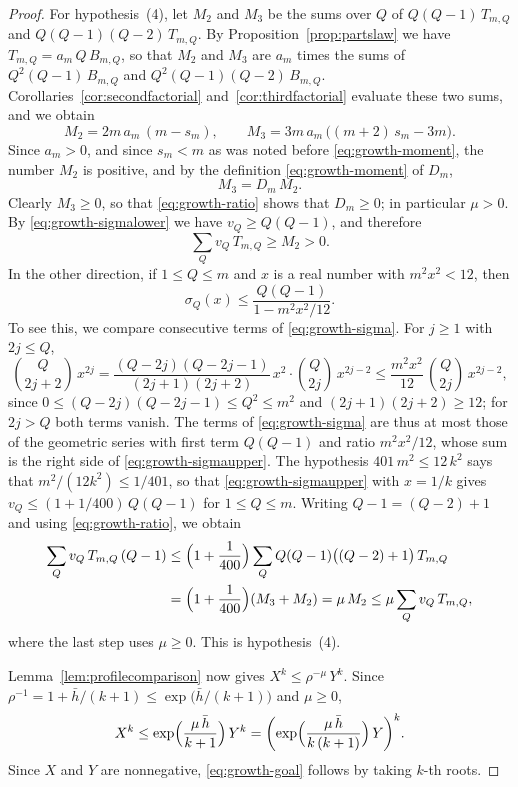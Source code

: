 \documentclass{amsart}
\theoremstyle{definition}
\theoremstyle{remark}
\numberwithin{equation}{section}
\begin{document}
\begin{proof}
For hypothesis~(4), let $M_2$
and $M_3$ be the sums over $Q$ of $Q(Q-1)\,T_{m,Q}$ and
$Q(Q-1)(Q-2)\,T_{m,Q}$. By Proposition~\ref{prop:partslaw} we have
$T_{m,Q}=a_m\,Q\,B_{m,Q}$, so that $M_2$ and $M_3$ are $a_m$ times the sums
of $Q^2(Q-1)\,B_{m,Q}$ and $Q^2(Q-1)(Q-2)\,B_{m,Q}$.
Corollaries~\ref{cor:secondfactorial} and~\ref{cor:thirdfactorial} evaluate
these two sums, and we obtain
\[
M_2=2m\,a_m\,(m-s_m),\qquad M_3=3m\,a_m\,\bigl((m+2)\,s_m-3m\bigr).
\]
Since $a_m>0$, and since $s_m<m$ as was noted before
\eqref{eq:growth-moment}, the number $M_2$ is positive, and by the
definition \eqref{eq:growth-moment} of $D_m$,
\begin{equation}\label{eq:growth-ratio}
M_3=D_m\,M_2.
\end{equation}
Clearly $M_3\ge0$, so that \eqref{eq:growth-ratio} shows that $D_m\ge0$; in
particular $\mu>0$. By
\eqref{eq:growth-sigmalower} we have $v_Q\ge Q(Q-1)$, and therefore
\[
\sum_{Q}v_Q\,T_{m,Q}\ge M_2>0 .
\]
In the other direction, if $1\le Q\le m$ and $x$ is a real number with
$m^2x^2<12$, then
\begin{equation}\label{eq:growth-sigmaupper}
\sigma_Q(x)\le\frac{Q(Q-1)}{1-m^2x^2/12}.
\end{equation}
To see this, we compare consecutive terms of \eqref{eq:growth-sigma}. For
$j\ge1$ with $2j\le Q$,
\[
\binom{Q}{2j+2}\,x^{2j}
=\frac{(Q-2j)(Q-2j-1)}{(2j+1)(2j+2)}\,x^2\cdot\binom{Q}{2j}\,x^{2j-2}
\le\frac{m^2x^2}{12}\,\binom{Q}{2j}\,x^{2j-2},
\]
since $0\le(Q-2j)(Q-2j-1)\le Q^2\le m^2$ and $(2j+1)(2j+2)\ge12$; for $2j>Q$
both terms vanish. The terms of \eqref{eq:growth-sigma} are thus at most
those of the geometric series with first term $Q(Q-1)$ and ratio
$m^2x^2/12$, whose sum is the right side of \eqref{eq:growth-sigmaupper}.
The hypothesis $401\,m^2\le12\,k^2$ says that
$m^2/(12k^2)\le1/401$, so that \eqref{eq:growth-sigmaupper} with $x=1/k$
gives $v_Q\le(1+1/400)\,Q(Q-1)$ for $1\le Q\le m$. Writing $Q-1=(Q-2)+1$
and using \eqref{eq:growth-ratio}, we obtain
\begin{align*}
\sum_{Q}v_Q\,T_{m,Q}\,(Q-1)
&\le\Bigl(1+\frac1{400}\Bigr)\sum_{Q}Q(Q-1)\bigl((Q-2)+1\bigr)\,T_{m,Q}\\
&=\Bigl(1+\frac1{400}\Bigr)(M_3+M_2)=\mu\,M_2
\le\mu\sum_{Q}v_Q\,T_{m,Q},
\end{align*}
where the last step uses $\mu\ge0$. This is hypothesis~(4).

Lemma~\ref{lem:profilecomparison} now gives $X^k\le\rho^{-\mu}\,Y^k$. Since
$\rho^{-1}=1+\bar h/(k+1)\le\exp\bigl(\bar h/(k+1)\bigr)$ and $\mu\ge0$,
\[
X^k\le\exp\Bigl(\frac{\mu\,\bar h}{k+1}\Bigr)\,Y^k
=\biggl(\exp\Bigl(\frac{\mu\,\bar h}{k\,(k+1)}\Bigr)\,Y\biggr)^{k}.
\]
Since $X$ and $Y$ are nonnegative, \eqref{eq:growth-goal} follows by taking
$k$-th roots.
\end{proof}
\end{document}
